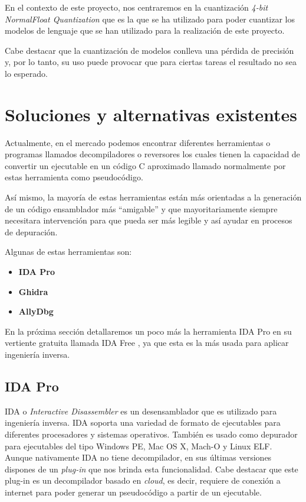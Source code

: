 En el contexto de este proyecto, nos centraremos en la cuantización \textit{4-bit
NormalFloat Quantization} que es la que se ha utilizado para poder cuantizar los
modelos de lenguaje que se han utilizado para la realización de este proyecto.

Cabe destacar que la cuantización de modelos conlleva una pérdida de precisión y, por
lo tanto, su uso puede provocar que para ciertas tareas el resultado no sea lo esperado.

\section{Soluciones y alternativas existentes}
\label{sec:alternativas}


Actualmente, en el mercado podemos encontrar diferentes herramientas o programas llamados
decompiladores o reversores los cuales tienen la capacidad de convertir un ejecutable
en un código C aproximado llamado normalmente por estas herramienta como pseudocódigo.

Así mismo, la mayoría de estas herramientas están más orientadas a la generación de un
código ensamblador más ``amigable'' y que mayoritariamente siempre necesitara intervención
para que pueda ser más legible y así ayudar en procesos de depuración.

Algunas de estas herramientas son:

\begin{itemize}
    \item \bf IDA Pro \cite{IDAProWebSite}
    \item \bf Ghidra \cite{GhidraSite}
    \item \bf AllyDbg \cite{OllyDbgSite}
\end{itemize}

En la próxima sección detallaremos un poco más la herramienta IDA Pro en su vertiente
gratuita llamada IDA Free \cite{IDAFreeSite}, ya que esta es la más usada para aplicar
ingeniería inversa.

\subsection{IDA Pro}
\label{subsec:IDA_pro}


IDA o \textit{Interactive Disassembler} es un desensamblador que es utilizado para
ingeniería inversa. IDA soporta una variedad de formato de ejecutables para diferentes
procesadores y sistemas operativos. También es usado como depurador para ejecutables
del tipo Windows PE, Mac OS X, Mach-O y Linux ELF\cite{IDAPro_Wikipedia}. Aunque
nativamente IDA no tiene decompilador, en sus últimas versiones dispones de un \textit{plug-in}
que nos brinda esta funcionalidad. Cabe destacar que este plug-in es un decompilador
basado en \textit{cloud}, es decir, requiere de conexión a internet para poder generar
un pseudocódigo a partir de un ejecutable.

